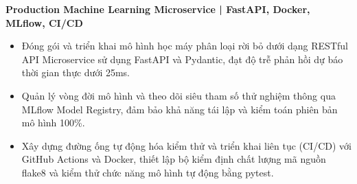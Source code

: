 \begin{cvtipbox}
\textbf{Production Machine Learning Microservice | FastAPI, Docker, MLflow, CI/CD}
\begin{itemize}
    \item Đóng gói và triển khai mô hình học máy phân loại rời bỏ dưới dạng RESTful API Microservice sử dụng FastAPI và Pydantic, đạt độ trễ phản hồi dự báo thời gian thực dưới 25ms.
    \item Quản lý vòng đời mô hình và theo dõi siêu tham số thử nghiệm thông qua MLflow Model Registry, đảm bảo khả năng tái lập và kiểm toán phiên bản mô hình 100\%.
    \item Xây dựng đường ống tự động hóa kiểm thử và triển khai liên tục (CI/CD) với GitHub Actions và Docker, thiết lập bộ kiểm định chất lượng mã nguồn flake8 và kiểm thử chức năng mô hình tự động bằng pytest.
\end{itemize}
\end{cvtipbox}
